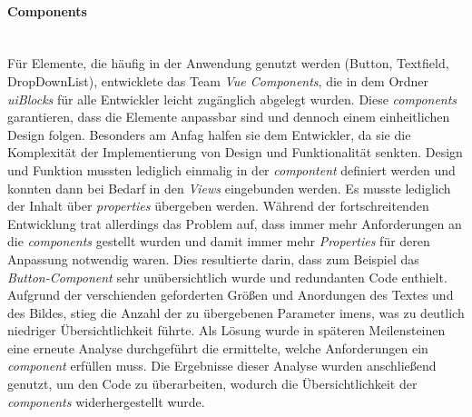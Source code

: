 \documentclass[10pt, a4paper]{article}
\begin{document}
\paragraph*{Components}$~$ \\
Für Elemente, die häufig in der Anwendung genutzt werden (Button, Textfield, DropDownList), entwicklete das Team \textit{Vue Components}, die in dem Ordner \textit{uiBlocks} für alle Entwickler leicht zugänglich abgelegt wurden. Diese \textit{components} garantieren, dass die Elemente anpassbar sind und dennoch einem einheitlichen Design folgen. Besonders am Anfag halfen sie dem Entwickler, da sie die Komplexität der Implementierung von Design und Funktionalität senkten. Design und Funktion mussten lediglich einmalig in der \textit{compontent} definiert werden und konnten dann bei Bedarf in den \textit{Views} eingebunden werden. Es musste lediglich der Inhalt über \textit{properties} übergeben werden. Während der fortschreitenden Entwicklung trat allerdings das Problem auf, dass immer mehr Anforderungen an die \textit{components} gestellt wurden und damit immer mehr \textit{Properties} für deren Anpassung notwendig waren. Dies resultierte darin, dass zum Beispiel das \textit{Button-Component} sehr unübersichtlich wurde und redundanten Code enthielt. Aufgrund der verschienden geforderten Größen und Anordungen des Textes und des Bildes, stieg die Anzahl der zu übergebenen Parameter imens, was zu deutlich niedriger Übersichtlichkeit führte. Als Lösung wurde in späteren Meilensteinen eine erneute Analyse durchgeführt die ermittelte, welche Anforderungen ein \textit{component} erfüllen muss. Die Ergebnisse dieser Analyse wurden anschließend genutzt, um den Code zu überarbeiten, wodurch die Übersichtlichkeit der \textit{components} widerhergestellt wurde.
\end{document}

